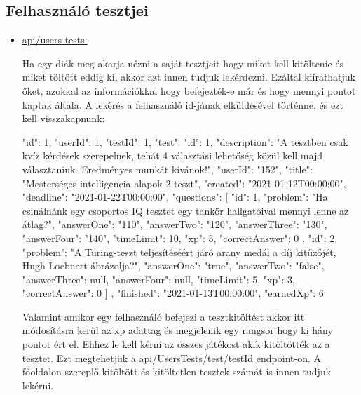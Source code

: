 \subsection{Felhasználó tesztjei}
\begin{itemize}[label={$\bullet$}, topsep=0pt, itemsep=0pt, leftmargin=15pt]
    \item[] {\url{api/users-tests:}}
          \begin{addmargin}[\parindent]{0pt}
              Ha egy diák meg akarja nézni a saját tesztjeit hogy miket kell kitöltenie és miket töltött eddig ki,  akkor azt innen tudjuk lekérdezni. Ezáltal kiírathatjuk őket, azokkal az információkkal hogy befejezték-e már és hogy mennyi pontot kaptak általa. A lekérés a felhasználó id-jának elküldésével történne, és ezt kell visszakapnunk:

              \begin{json}
                  {
                  "id": 1,
                  "userId": 1,
                  "testId": 1,
                  "test": {
                  "id": 1,
                  "description": "A tesztben csak kvíz kérdések szerepelnek, tehát 4 választási lehetőség közül kell majd választaniuk. Eredményes munkát kívánok!",
                  "userId": "152",
                  "title": "Mesterséges intelligencia alapok 2 teszt",
                  "created": "2021-01-12T00:00:00",
                  "deadline": "2021-01-22T00:00:00",
                  "questions": [
                  {
                          "id": 1,
                          "problem": "Ha csinálnánk egy csoportos IQ tesztet egy tankör hallgatóival mennyi lenne az átlag?",
                          "answerOne": "110",
                          "answerTwo": "120",
                          "answerThree": "130",
                          "answerFour": "140",
                          "timeLimit": 10,
                          "xp": 5,
                          "correctAnswer": 0
                      },
                  {
                          "id": 2,
                          "problem": "A Turing-teszt teljesítéséért járó arany medál a díj kitűzőjét, Hugh Loebnert ábrázolja?",
                          "answerOne": "true",
                          "answerTwo": "false",
                          "answerThree": null,
                          "answerFour": null,
                          "timeLimit": 5,
                          "xp": 3,
                          "correctAnswer": 0
                      }
                  ]
                  },
                  "finished": "2021-01-13T00:00:00",
                  "earnedXp": 6
                  }
              \end{json}

              Valamint amikor egy felhasználó befejezi a tesztkitöltést akkor itt módosításra kerül az xp adattag és megjelenik egy rangsor hogy ki hány pontot ért el. Ehhez le kell kérni az összes játékost akik kitöltötték az a tesztet. Ezt megtehetjük a \url{api/UsersTests/test/testId} endpoint-on. A főoldalon szereplő kitöltött és kitöltetlen tesztek számát is innen tudjuk lekérni.
          \end{addmargin}
\end{itemize}
